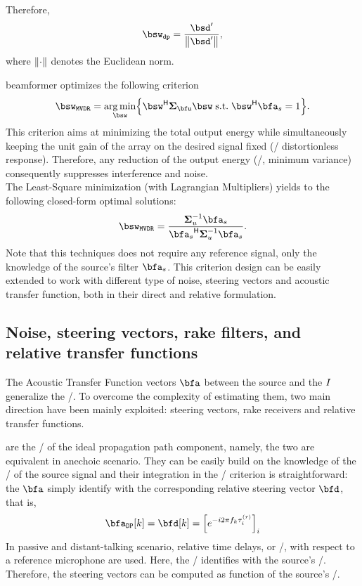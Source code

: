 Therefore,
\begin{equation}
    \bsw_{\mathtt{dp}} = \frac{\bsd'}{\kvvbar{\bsd'}},
\end{equation}
where $\kvvbar{\cdot}$ denotes the Euclidean norm.

 beamformer optimizes the following criterion
\begin{equation}
    \bsw_{\MVDR} = \kargmin_{\bsw} \kbrace{ \khermitian{\bsw} \xpsd_{\bfu} \bsw\;\text{s.t.}\;\khermitian{\bsw} \bfa_{\src} = 1}
    .
\end{equation}
This criterion aims at minimizing the total output energy while simultaneously keeping the unit gain of the array on the desired signal fixed (\ie/ distortionless response).
Therefore, any reduction of the output energy (\ie/, minimum variance) consequently suppresses interference and noise.
\\The Least-Square minimization (with Lagrangian Multipliers) yields to the following closed-form optimal solutions:
\begin{equation}\label{eq:dechorateapp:mvdr}
    \bsw_{\MVDR} = \frac{\kinv{\xpsd}_{u} \bfa_{\src}}
                                {\khermitian{\bfa_\src} \kinv{\xpsd}_{u} \bfa_\src}
    .
\end{equation}
Note that this techniques does not require any reference signal, only the knowledge of the source's filter $\bfa_\src$.
This criterion design can be easily extended to work with different type of noise, steering vectors and acoustic transfer function, both in their direct and relative formulation.

\subsection{Noise, steering vectors, rake filters, and relative transfer functions}

The Acoustic Transfer Function vectors $\bfa$ between the source and the $I$ generalize the \RTFs/.
To overcome the complexity of estimating them, two main direction have been mainly exploited: steering vectors, rake receivers and relative transfer functions.

 are the \RTFs/ of the ideal propagation path component, namely, the two are equivalent in anechoic scenario.
They can be easily build on the knowledge of the \TOA/ of the source signal and their integration in the \MVDR/ criterion is straightforward: the $\bfa$ simply identify with the corresponding relative steering vector $\bfd$, that is,
\begin{equation}
    \bfa_{\mathtt{DP}}[k] = \bfd[k] = \kbracket{ \cste^{-\csti 2 \pi f_k \tau_i^{(r)}} }_i
\end{equation}
In passive and distant-talking scenario, relative time delays, or \TDOAs/, with respect to a reference microphone are used.
Here, the \TDOAs/ identifies with the source's \DOA/. Therefore, the steering vectors can be computed as function of the source's \DOA/.


